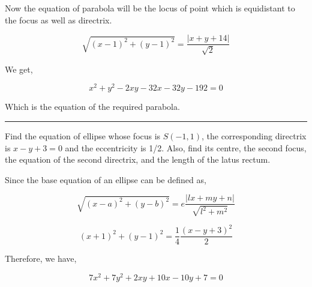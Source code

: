 \documentclass[twocolumn]{article}
\begin{document}
\begin{CJK*}{UTF8}{gbsn}
Now the equation of parabola will be the locus of point which is equidistant to the focus as well as directrix. 

\[
    \sqrt{(x-1)^{2} + (y-1)^{2}} = \frac{|x+y+14|}{\sqrt{2} }
\]

We get,  

\[
    \boxed{x^{2} +  y^{2} - 2xy - 32x - 32y- 192 = 0}
\]

Which is the equation of the required parabola. 

\vspace*{0.1in}

\hrule

\begin{question}
    Find the equation of ellipse whose focus is \(S  (-1, 1)\), the corresponding directrix is \(x-y+3 = 0\) and the eccentricity is 1/2. Also, find its centre, the second focus, the equation of the second directrix, and the length of the latus rectum. 
\end{question}

Since the base equation of an ellipse can be defined as, 

\[
    \sqrt{(x-a)^{2} + (y-b)^{2} } = e \frac{\vert lx + my + n \vert }{\sqrt{l^{2} + m^{2} } } 
\]

\[
    (x+1)^{2} + (y-1)^{2} = \frac{1}{4} \frac{(x-y+3)^{2} }{2}
\]

Therefore, we have, 

\[
    7x^{2} + 7y^{2} + 2xy  + 10x - 10y + 7= 0
\]

\begin{center}
\end{center}


\end{CJK*}
\end{document}
